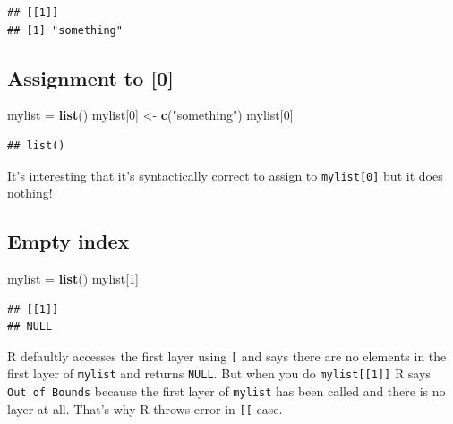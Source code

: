 \documentclass[]{book}
\newenvironment{Shaded}{\begin{snugshade}}{\end{snugshade}}
\newcommand{\DecValTok}[1]{\textcolor[rgb]{0.00,0.00,0.81}{#1}}
\newcommand{\KeywordTok}[1]{\textcolor[rgb]{0.13,0.29,0.53}{\textbf{#1}}}
\newcommand{\NormalTok}[1]{#1}
\newcommand{\StringTok}[1]{\textcolor[rgb]{0.31,0.60,0.02}{#1}}
\begin{document}
\begin{verbatim}
## [[1]]
## [1] "something"
\end{verbatim}

\hypertarget{assignment-0}{%
\subsection*{Assignment to {[}0{]}}\label{assignment-0}}

\begin{Shaded}
\begin{Highlighting}[]
\NormalTok{mylist =}\StringTok{ }\KeywordTok{list}\NormalTok{()}
\NormalTok{mylist[}\DecValTok{0}\NormalTok{] <-}\StringTok{ }\KeywordTok{c}\NormalTok{(}\StringTok{"something"}\NormalTok{)}
\NormalTok{mylist[}\DecValTok{0}\NormalTok{]}
\end{Highlighting}
\end{Shaded}

\begin{verbatim}
## list()
\end{verbatim}

It's interesting that it's syntactically correct to assign to \texttt{mylist{[}0{]}} but it does nothing!

\hypertarget{empty-index}{%
\subsection*{Empty index}\label{empty-index}}

\begin{Shaded}
\begin{Highlighting}[]
\NormalTok{mylist =}\StringTok{ }\KeywordTok{list}\NormalTok{()}
\NormalTok{mylist[}\DecValTok{1}\NormalTok{]}
\end{Highlighting}
\end{Shaded}

\begin{verbatim}
## [[1]]
## NULL
\end{verbatim}

R defaultly accesses the first layer using \texttt{{[}} and says there are no elements in the first layer of \texttt{mylist} and returns \texttt{NULL}. But when you do \texttt{mylist{[}{[}1{]}{]}} R says \texttt{Out\ of\ Bounds} because the first layer of \texttt{mylist} has been called and there is no layer at all. That's why R throws error in \texttt{{[}{[}} case.
\end{document}
